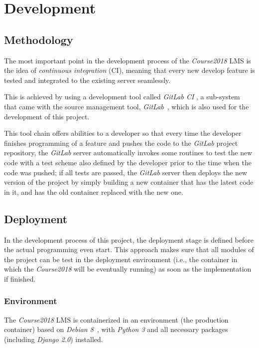 

\chapter{Development}
\label{chap:DEV}

\section{Methodology}
The most important point in the development process of the \emph{Course2018}
LMS is the idea of \emph{continuous integration} (CI), meaning that every new
develop feature is tested and integrated to the existing server seamlessly.

\medskip
This is achieved by using a development tool called \emph{GitLab CI}
\cite{gitlabCI}, a sub-system that came with the source management tool,
\emph{GitLab}~\cite{gitlab}, which is also used for the development of this
project. 

\medskip

This tool chain offers abilities to a developer so that every time
the developer finishes programming of a feature and pushes the code to the
\emph{GitLab} project repository, the \emph{GitLab} server automatically
invokes some
routines to test the new code with a test scheme also defined by the developer
prior to the time when the code was pushed; if all tests are passed, 
the \emph{GitLab} server then deploys the new version of the project by simply
building a new container that has the latest code in it, and has the old
container replaced with the new one. 

\section{Deployment}
In the development process of this project, the deployment stage is defined
before the actual programming even start. This approach makes sure that all
modules of the project can be test in the
deployment environment (i.e., the container in which the \emph{Course2018}
will be eventually running) as soon as the implementation if finished.

\subsection{Environment}
The \emph{Course2018} LMS is containerized in an environment
(the production container) based on
\emph{Debian 8}~\cite{debian}, with \emph{Python 3} and all necessary packages
(including \emph{Django 2.0}) installed.

